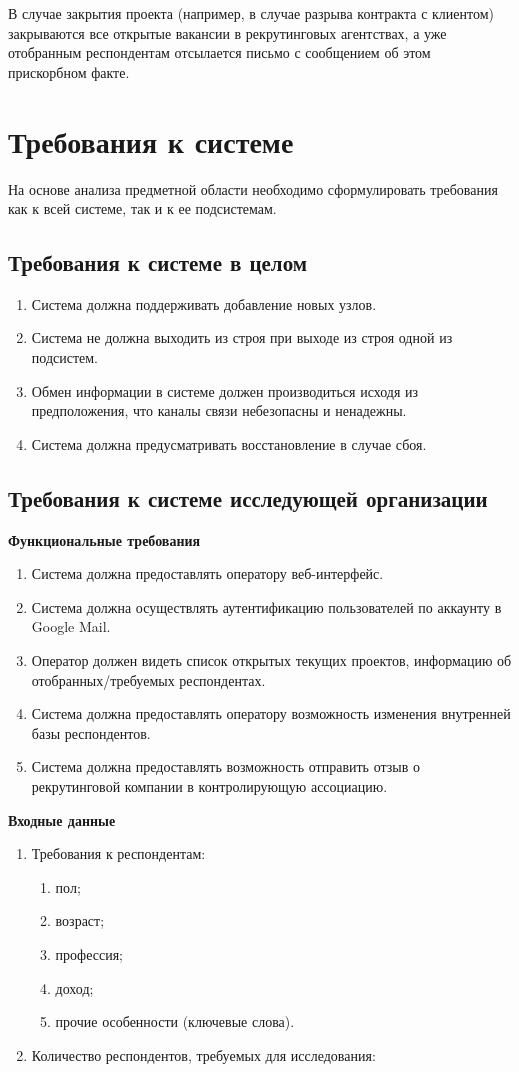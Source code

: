 В случае закрытия проекта (например, в случае разрыва контракта с клиентом) закрываются все открытые вакансии в рекрутинговых агентствах, а уже отобранным респондентам отсылается письмо с сообщением об этом прискорбном факте.

\section{Требования к системе}
На основе анализа предметной области необходимо сформулировать требования как к всей системе, так и к ее подсистемам.

\subsection{Требования к системе в целом}
\begin{enumerate}
\item Система должна поддерживать добавление новых узлов.
\item Система не должна выходить из строя при выходе из строя одной из подсистем.
\item Обмен информации в системе должен производиться исходя из предположения, что каналы связи небезопасны и ненадежны.
\item Система должна предусматривать восстановление в случае сбоя.
\end{enumerate}

\subsection{Требования к системе исследующей организации}

\textbf{Функциональные требования}
\begin{enumerate}
\item Система должна предоставлять оператору веб-интерфейс.
\item Система должна осуществлять  аутентификацию пользователей по аккаунту в Google Mail.
\item Оператор должен видеть список открытых текущих проектов, информацию об отобранных/требуемых респондентах.
\item Система должна предоставлять оператору возможность изменения внутренней базы респондентов.
\item Система должна предоставлять возможность отправить отзыв о рекрутинговой компании в контролирующую ассоциацию.
\end{enumerate}

\textbf{Входные данные}
\begin{enumerate}
\item Требования к респондентам:
\begin{enumerate}
\item пол;
\item возраст;
\item профессия;
\item доход;
\item прочие особенности (ключевые слова).
\end{enumerate}
\item Количество респондентов, требуемых для исследования:
\end{enumerate}

